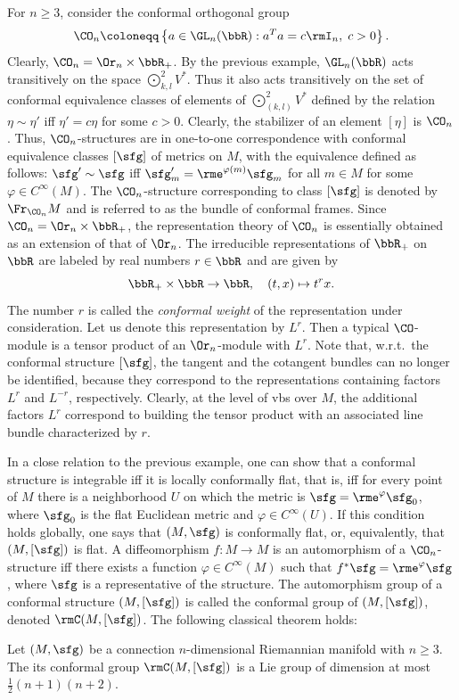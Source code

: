 \begin{example}
    For $n\geq 3$, consider the conformal orthogonal group 
    \[\CO_n\coloneqq \left\{a\in\GL_n(\bbR):a^Ta=c\rmI_n,\; c>0\right\}.\]
    Clearly, $\CO_n=\Or_n\times\bbR_+$. By the previous example, $\GL_n(\bbR)$ acts transitively on the space $\bigodot^2_{k,l}V^\ast$. Thus it also acts transitively on the set of conformal equivalence classes of elements of $\bigodot^2_{(k,l)}V^\ast$ defined by the relation $\eta\sim\eta'$ iff $\eta'=c\eta$ for some $c>0$. Clearly, the stabilizer of an element $[\eta]$ is $\CO_n$. Thus, $\CO_n$-structures are in one-to-one correspondence with conformal equivalence classes $[\sfg]$ of metrics on $M$, with the equivalence defined as follows: $\sfg'\sim\sfg$ iff $\sfg'_m=\rme^{\varphi(m)}\sfg_m$ for all $m\in M$ for some $\varphi\in C^\infty(M)$. The $\CO_n$-structure corresponding to class $[\sfg]$ is denoted by $\Fr_{\CO_n}M$ and is referred to as the bundle of conformal frames.
    Since $\CO_n=\Or_n\times\bbR_+$, the representation theory of $\CO_n$ is essentially obtained as an extension of that of $\Or_n$. The irreducible representations of $\bbR_+$ on $\bbR$ are labeled by real numbers $r\in\bbR$ and are given by 
    \[\bbR_+\times\bbR\to \bbR,\quad (t,x)\mapsto t^r x.\]
    The number $r$ is called the \emph{conformal weight} of the representation under consideration. Let us denote this representation by $L^r$. Then a typical $\CO$-module is a tensor product of an $\Or_n$-module with $L^r$. Note that, w.r.t.\ the conformal structure $[\sfg]$, the tangent and the cotangent bundles can no longer be identified, because they correspond to the representations containing factors $L^r$ and $L^{-r}$, respectively. Clearly, at the level of \glspl{vb} over $M$, the additional factors $L^r$ correspond to building the tensor product with an associated line bundle characterized by $r$.

    In a close relation to the previous example, one can show that a conformal structure is integrable iff it is locally conformally flat, that is, iff for every point of $M$ there is a neighborhood $U$ on which the metric is $\sfg=\rme^{\varphi}\sfg_0$, where $\sfg_0$ is the flat Euclidean metric and $\varphi\in C^\infty(U)$. If this condition holds globally, one says that $(M,\sfg)$ is conformally flat, or, equivalently, that $(M,[\sfg])$ is flat. A diffeomorphism $f:M\to M$ is an automorphism of a $\CO_n$-structure iff there exists a function $\varphi\in C^\infty(M)$ such that $f^\ast\sfg=\rme^\varphi \sfg$, where $\sfg$ is a representative of the structure. The automorphism group of a conformal structure $(M,[\sfg])$ is called the conformal group of $(M,[\sfg])$, denoted $\rmC(M,[\sfg])$. The following classical theorem holds: 
    \begin{thm}\label{thm Liouville conformal}
        Let $(M,\sfg)$ be a connection $n$-dimensional Riemannian manifold with $n\geq 3$. The its conformal group $\rmC(M,[\sfg])$ is a Lie group of dimension at most $\frac12(n+1)(n+2)$.
    \end{thm}
\end{example}


